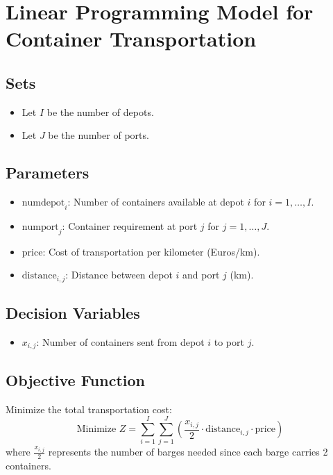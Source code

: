 \documentclass{article}
\begin{document}
\section*{Linear Programming Model for Container Transportation}

\subsection*{Sets}
\begin{itemize}
    \item Let \( I \) be the number of depots.
    \item Let \( J \) be the number of ports.
\end{itemize}

\subsection*{Parameters}
\begin{itemize}
    \item \( \text{numdepot}_i \): Number of containers available at depot \( i \) for \( i = 1, \ldots, I \).
    \item \( \text{numport}_j \): Container requirement at port \( j \) for \( j = 1, \ldots, J \).
    \item \( \text{price} \): Cost of transportation per kilometer (Euros/km).
    \item \( \text{distance}_{i,j} \): Distance between depot \( i \) and port \( j \) (km).
\end{itemize}

\subsection*{Decision Variables}
\begin{itemize}
    \item \( x_{i,j} \): Number of containers sent from depot \( i \) to port \( j \).
\end{itemize}

\subsection*{Objective Function}
Minimize the total transportation cost:
\[
\text{Minimize } Z = \sum_{i=1}^{I} \sum_{j=1}^{J} \left( \frac{x_{i,j}}{2} \cdot \text{distance}_{i,j} \cdot \text{price} \right)
\]
where \( \frac{x_{i,j}}{2} \) represents the number of barges needed since each barge carries 2 containers.
\end{document}

